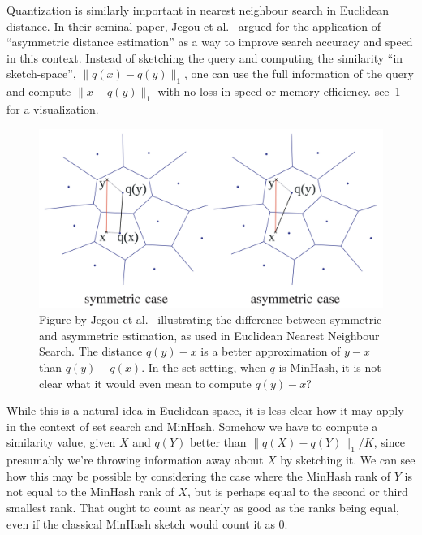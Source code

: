 Quantization is similarly important in nearest neighbour search in Euclidean distance.
In their seminal paper, Jegou et al.~\cite{jegou2010product}
argued for the application of ``asymmetric distance estimation'' as a way to improve search accuracy and speed in this context.
Instead of sketching the query and computing the similarity ``in sketch-space'', $\|q(x)-q(y)\|_1$,
one can use the full information of the query and compute $\|x-q(y)\|_1$ with no loss in speed or memory efficiency.
see~\cref{fig:jegou} for a visualization.


\begin{figure}[h]
   \centering
   \includegraphics[width=\linewidth]{figures/pq}
\caption{Figure by Jegou et al.~\cite{jegou2010product} illustrating the difference between symmetric and asymmetric estimation, as used in Euclidean Nearest Neighbour Search.
   The distance $q(y)-x$ is a better approximation of $y-x$ than $q(y)-q(x)$.
   In the set setting, when $q$ is MinHash, it is not clear what it would even mean to compute $q(y)-x$?
}
   \label{fig:jegou}
\end{figure}


While this is a natural idea in Euclidean space, it is less clear how it may apply in the context of set search and MinHash.
Somehow we have to compute a similarity value, given $X$ and $q(Y)$ better than $\|q(X)-q(Y)\|_1/K$, since presumably we're throwing information away about $X$ by sketching it.
We can see how this may be possible by considering the case where the MinHash rank of $Y$ is not equal to the MinHash rank of $X$, but is perhaps equal to the second or third smallest rank.
That ought to count as nearly as good as the ranks being equal, even if the classical MinHash sketch would count it as 0.

